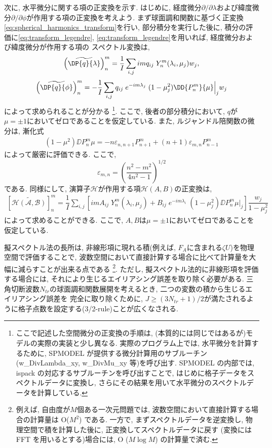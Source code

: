 次に, 水平微分に関する項の正変換を示す. 
はじめに, 経度微分$\partial/\partial \lambda$および緯度微分$\partial/\partial \phi$が作用する項の正変換を考えよう. 
まず球面調和関数に基づく正変換\eqref{eq:spherical_harmonics_transform}を行い, 部分積分を実行した後に, 
積分の評価に\eqref{eq:transform_legendre}, \eqref{eq:transform_legendre}を用いれば, 経度微分および緯度微分が作用する項の
スペクトル変換は, 
\begin{align}
  \left(\widetilde{\DP{q}{\lambda}}\right)^m_n = \dfrac{1}{I} \sum_{i,j} im q_{ij} \; Y^m_n(\lambda_i,\mu_j) w_j, 
\end{align}
\begin{align}
  \left(\widetilde{\DP{q}{\phi}}\right)^m_n = - \dfrac{1}{I} \sum_{i,j} q_{ij} \; e^{-im\lambda_j} \; (1-\mu_j^2) \DD{P^m_n}{\mu} \Big|_j w_j
\end{align}
によって求められることが分かる%
\footnote{
ここで記述した空間微分の正変換の手順は, (本質的には同じではあるが)モデルの実際の実装と少し異なる. 
実際のプログラム上では, 水平微分を計算するために, 
SPMODEL が提供する微分計算用のサブルーチン(w\_DivLambda\_xy, w\_DivMu\_xy 等)を呼び出す.
SPMODEL の内部では, ispack の対応するサブルーチンを呼び出すことで, はじめに格子データをスペクトルデータに変換し, 
さらにその結果を用いて水平微分のスペクトルデータを計算している. 
}. 
ここで, 後者の部分積分において, $q$が$\mu=\pm 1$においてゼロであることを仮定している. 
また, ルジャンドル陪関数の微分は, 漸化式
\begin{align}
 (1-\mu^2) \DD{P^m_n}{\mu} = - n \varepsilon_{n,n+1}  P^m_{n+1} + (n+1) \varepsilon_{m,n} P^m_{n-1}
\end{align}
によって厳密に評価できる. 
ここで, 
$$
 \varepsilon_{m,n} = \left( \dfrac{n^2 - m^2}{4n^2 -1} \right)^{1/2}
$$
である. 
同様にして, 演算子$\mathscr{H}$が作用する項$\mathscr{H}(A,B)$の正変換は, 
\begin{align}
  \left[\widetilde{\mathscr{H(A,B)}}\right]^m_n
 =   \dfrac{1}{I} \sum_{i,j} 
   \left[   im A_{ij} \; Y^m_n(\lambda_i,\mu_j)
          + B_{ij}\; e^{-im\lambda_i}\;  (1-\mu_j^2) \DD{P^m_n}{\mu} \Big|_j \right] \dfrac{w_j}{1-\mu_j^2} 
\label{eq:div_operator_H_hspm}
\end{align}
によって求めることができる.  
ここで, $A,B$は$\mu=\pm 1$においてゼロであることを仮定している. 

擬スペクトル法の長所は, 非線形項に現れる積(例えば, $F_A$に含まれる$\zeta U$)を物理空間で評価することで, 
波数空間において直接計算する場合に比べて計算量を大幅に減らすことが出来る点である 
\footnote{
例えば, 自由度が$M$個ある一次元問題では, 波数空間において直接計算する場合の計算量は O($M^2$) である.
一方で, まずスペクトルデータを逆変換し, 物理空間で積を計算した後に, 正変換してスペクトルデータに戻す
(変換には FFT を用いるとする)場合には, O ($M \log M$) の計算量で済む.   
}. 
ただし, 擬スペクトル法的に非線形項を評価する場合には, それにより生じるエイリアシング誤差を取り除く必要がある.  
三角切断波数$N_{tr}$の球面調和関数展開を考えるとき, 二つの変数の積から生じるエイリアシング誤差を
完全に取り除くために, $J \ge (3N_{tr} + 1)/2$が満たされるように格子点数を設定する(3/2-rule)ことが広くなされる.   

